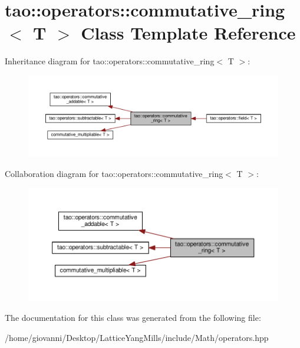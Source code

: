 \hypertarget{classtao_1_1operators_1_1commutative__ring_3_01T_01_4}{}\section{tao\+:\+:operators\+:\+:commutative\+\_\+ring$<$ T $>$ Class Template Reference}
\label{classtao_1_1operators_1_1commutative__ring_3_01T_01_4}


Inheritance diagram for tao\+:\+:operators\+:\+:commutative\+\_\+ring$<$ T $>$\+:\nopagebreak
\begin{figure}[H]
\begin{center}
\leavevmode
\includegraphics[width=350pt]{classtao_1_1operators_1_1commutative__ring_3_01T_01_4__inherit__graph}
\end{center}
\end{figure}


Collaboration diagram for tao\+:\+:operators\+:\+:commutative\+\_\+ring$<$ T $>$\+:\nopagebreak
\begin{figure}[H]
\begin{center}
\leavevmode
\includegraphics[width=350pt]{classtao_1_1operators_1_1commutative__ring_3_01T_01_4__coll__graph}
\end{center}
\end{figure}


The documentation for this class was generated from the following file\+:\begin{DoxyCompactItemize}
\item 
/home/giovanni/\+Desktop/\+Lattice\+Yang\+Mills/include/\+Math/operators.\+hpp\end{DoxyCompactItemize}
